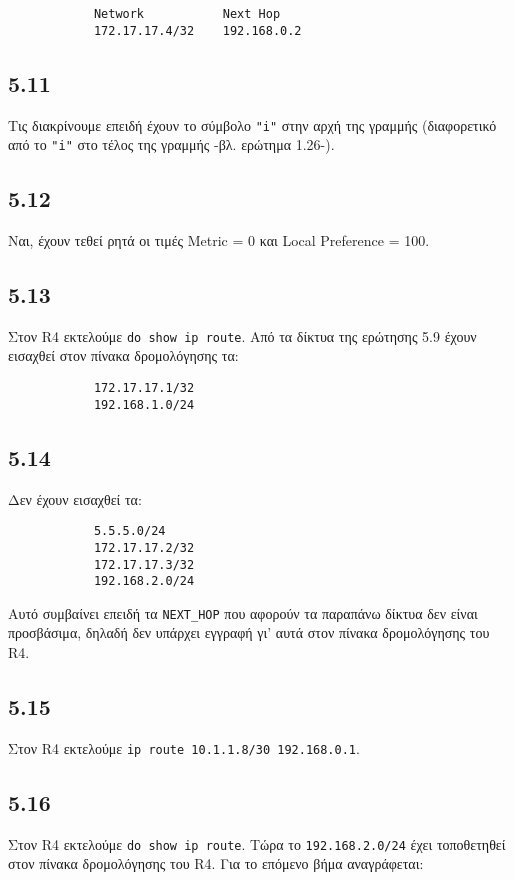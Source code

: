 \documentclass[a4paper, 12pt]{article}
\begin{document}
		\begin{verbatim}
			Network           Next Hop
			172.17.17.4/32    192.168.0.2
		\end{verbatim}

	\subsection*{5.11}
		Τις διακρίνουμε επειδή έχουν το σύμβολο \verb|"i"| στην αρχή της γραμμής (διαφορετικό από το \verb|"i"| στο τέλος της γραμμής -βλ. ερώτημα 1.26-). 
		
	\subsection*{5.12}
		Ναι, έχουν τεθεί ρητά οι τιμές Metric = 0 και Local Preference = 100.

	\subsection*{5.13}
		Στον R4 εκτελούμε \verb|do show ip route|. Από τα δίκτυα της ερώτησης 5.9 έχουν εισαχθεί στον πίνακα δρομολόγησης τα:
		
		\begin{verbatim}
			172.17.17.1/32
			192.168.1.0/24
		\end{verbatim}

	\subsection*{5.14}
		Δεν έχουν εισαχθεί τα:
		
		\begin{verbatim}
			5.5.5.0/24
			172.17.17.2/32
			172.17.17.3/32
			192.168.2.0/24
		\end{verbatim}
		
		Αυτό συμβαίνει επειδή τα \verb|NEXT_HOP| που αφορούν τα παραπάνω δίκτυα δεν είναι προσβάσιμα, δηλαδή δεν υπάρχει εγγραφή γι' αυτά στον πίνακα δρομολόγησης του R4. 

	\subsection*{5.15}
		Στον R4 εκτελούμε \verb|ip route 10.1.1.8/30 192.168.0.1|. 

	\subsection*{5.16}
		Στον R4 εκτελούμε \verb|do show ip route|. Τώρα το \verb|192.168.2.0/24| έχει τοποθετηθεί στον πίνακα δρομολόγησης του R4. Για το επόμενο βήμα αναγράφεται: 
		
\end{document}
